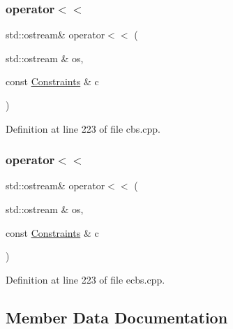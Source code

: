\subsubsection{\texorpdfstring{operator$<$$<$}{operator<<}\hspace{0.1cm}{\footnotesize\ttfamily [1/2]}}
{\footnotesize\ttfamily std\+::ostream\& operator$<$$<$ (\begin{DoxyParamCaption}\item[{std\+::ostream \&}]{os,  }\item[{const \hyperlink{struct_constraints}{Constraints} \&}]{c }\end{DoxyParamCaption})\hspace{0.3cm}{\ttfamily [friend]}}



Definition at line 223 of file cbs.\+cpp.

\mbox{\label{struct_constraints_a609a032077973e41f300c88a62d8f6fa}} 
\subsubsection{\texorpdfstring{operator$<$$<$}{operator<<}\hspace{0.1cm}{\footnotesize\ttfamily [2/2]}}
{\footnotesize\ttfamily std\+::ostream\& operator$<$$<$ (\begin{DoxyParamCaption}\item[{std\+::ostream \&}]{os,  }\item[{const \hyperlink{struct_constraints}{Constraints} \&}]{c }\end{DoxyParamCaption})\hspace{0.3cm}{\ttfamily [friend]}}



Definition at line 223 of file ecbs.\+cpp.



\subsection{Member Data Documentation}
\mbox{\label{struct_constraints_a26aec77e7e0f9352ffe6ed2e8d285d93}} 
